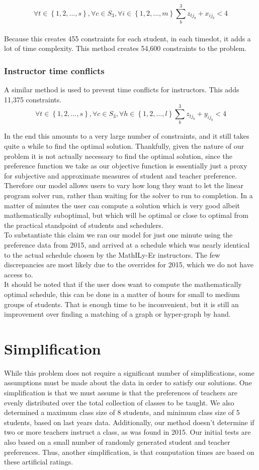 \documentclass[11pt]{article}
\begin{document}
\[\forall t \in \left\{ {1,2,...,s}\right\},\forall c \in S_3, \forall i \in \left\{ {1,2,...,m}\right\} \sum_{b}^{3}z_{tj_b}+x_{ij_b} < 4\]
\\Because this creates 455 constraints for each student, in each timeslot, it adds a lot of time complexity. This method creates 54,600 constraints to the problem.
\subsubsection{Instructor time conflicts}
A similar method is used to prevent time conflicts for instructors. This adds 11,375 constraints.
\[\forall t \in \left\{ {1,2,...,s}\right\},\forall c \in S_3, \forall h \in \left\{ {1,2,...,l}\right\} \sum_{b}^{3}z_{tj_b}+y_{ij_b} < 4\]

\indent In the end this amounts to a very large number of constraints, and it still takes quite a while to find the optimal solution. Thankfully, given the nature of our problem it is not actually necessary to find the optimal solution, since the preference function we take as our objective function is essentially just a proxy for subjective and approximate measures of student and teacher preference. Therefore our model allows users to vary how long they want to let the linear program solver run, rather than waiting for the solver to run to completion. In a matter of minutes the user can compute a solution which is very good albeit mathematically suboptimal, but which will be optimal or close to optimal from the practical standpoint of students and schedulers.\\
\indent To substantiate this claim we ran our model for just one minute using the preference data from 2015, and arrived at a schedule which was nearly identical to the actual schedule chosen by the MathILy-Er instructors. The few discrepancies are most likely due to the overrides for 2015, which we do not have access to.\\
\indent It should be noted that if the user does want to compute the mathematically optimal schedule, this can be done in a matter of hours for small to medium groups of students.  That is enough time to be inconvenient, but it is still an improvement over finding a matching of a graph or hyper-graph by hand.

\section{Simplification}
While this problem does not require a significant number of simplifications, some assumptions must be made about the data in order to satisfy our solutions. One simplification is that we must assume is that the preferences of teachers are evenly distributed over the total collection of classes to be taught. We also determined a maximum class size of 8 students, and minimum class size of 5 students, based on last years data. Additionally, our method doesn't determine if two or more teachers instruct a class, as was found in 2015. Our initial tests are also based on a small number of randomly generated student and teacher preferences. Thus, another simplification, is that computation times are based on these artificial ratings. \\
\end{document}
